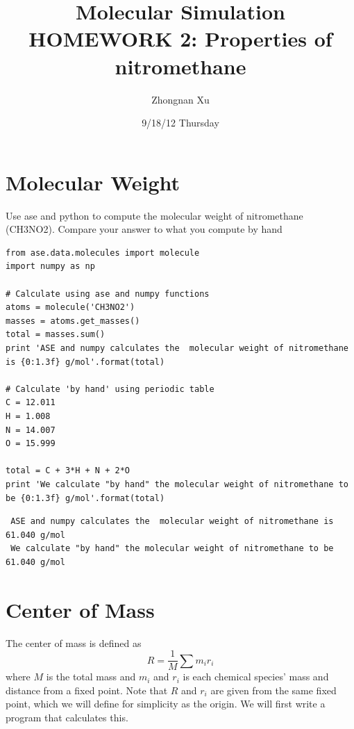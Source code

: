 \documentclass[11pt]{article}
\title{Molecular Simulation HOMEWORK 2: Properties of nitromethane}
\author{Zhongnan Xu}
\date{9/18/12 Thursday}
\begin{document}
\maketitle

\setcounter{tocdepth}{3}
\tableofcontents
\vspace*{1cm}

\section{Molecular Weight}
\label{sec-1}

Use ase and python to compute the molecular weight of nitromethane (CH3NO2).
Compare your answer to what you compute by hand


\begin{verbatim}
from ase.data.molecules import molecule
import numpy as np

# Calculate using ase and numpy functions
atoms = molecule('CH3NO2')
masses = atoms.get_masses()
total = masses.sum()
print 'ASE and numpy calculates the  molecular weight of nitromethane is {0:1.3f} g/mol'.format(total) 

# Calculate 'by hand' using periodic table
C = 12.011
H = 1.008
N = 14.007
O = 15.999

total = C + 3*H + N + 2*O
print 'We calculate "by hand" the molecular weight of nitromethane to be {0:1.3f} g/mol'.format(total)
\end{verbatim}

\begin{verbatim}
 ASE and numpy calculates the  molecular weight of nitromethane is 61.040 g/mol
 We calculate "by hand" the molecular weight of nitromethane to be 61.040 g/mol
\end{verbatim}
\section{Center of Mass}
\label{sec-2}

The center of mass is defined as 
\begin{equation}
R = \frac{1}{M} \sum m_ir_i
\end{equation}
where $M$ is the total mass and $m_i$ and $r_i$ is each chemical species' mass
and distance from a fixed point. Note that $R$ and $r_i$ are given from the same
fixed point, which we will define for simplicity as the origin. We will first write
a program that calculates this.
\end{document}
